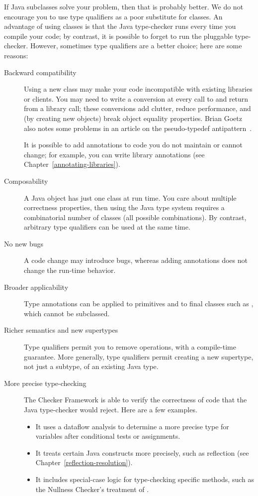 If Java subclasses solve your problem, then that is probably better.
We do not encourage you to use type qualifiers as a poor substitute for
classes.  An advantage of using classes is that the Java type-checker
runs every time you compile your code;
by contrast, it is possible to forget to run the pluggable
type-checker.  However, sometimes type qualifiers are a
better choice; here are some reasons:

\begin{description}

\item[Backward compatibility]
Using a new class may make your code incompatible with existing libraries or
clients.  You may need to write a conversion at every call to and return
from a library call; these conversions add clutter, reduce performance, and
(by creating new objects) break object equality properties.
Brian Goetz also notes some problems in an article on the
pseudo-typedef antipattern~\cite{Goetz2006:typedef}.

It is possible to add annotations to code you do not maintain or cannot
change; for example, you
can write library annotations (see Chapter~\ref{annotating-libraries}).

\item[Composability]
A Java object has just one class at run time.  You care about multiple
correctness properties, then using the Java type system requires a
combinatorial number of classes (all possible combinations).  By contrast,
arbitrary type qualifiers can be used at the same time.

\item[No new bugs]
A code change may introduce bugs, whereas adding
annotations does not change the run-time behavior.

\item[Broader applicability]
Type annotations can be applied to primitives and to final classes such as
, which cannot be subclassed.

\item[Richer semantics and new supertypes]
Type qualifiers permit you to remove operations, with a compile-time
guarantee.  More
generally, type qualifiers permit creating a new supertype, not just a
subtype, of an existing Java type.

\item[More precise type-checking]
The Checker Framework is able to verify the correctness of code that the
Java type-checker would reject.  Here are a few examples.
\begin{itemize}
\item
  It uses a dataflow analysis to determine a more precise type for
  variables after conditional tests or assignments.
\item
  It treats certain Java constructs more precisely, such as
  reflection (see Chapter~\ref{reflection-resolution}).
\item
  It includes special-case logic for type-checking specific methods, such
  as the Nullness Checker's treatment of .
\end{itemize}


\end{description}

